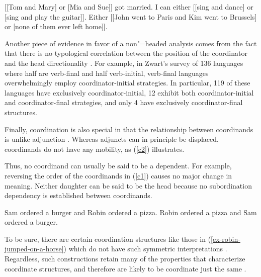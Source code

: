 \eal
\ex {}[[Tom and Mary] or [Mia and Sue]] got married.
\ex I can either [[sing and dance] or [sing and play the guitar]].
\ex Either [[John went to Paris and Kim went to Brussels] or [none of them ever left home]].
\zl

Another piece of evidence in favor of a non"=headed analysis comes from the fact that there is no typological correlation between the position of the coordinator and the head directionality \citep{zwart}.
For example, in Zwart's  survey of 136 languages where half are verb-final and half
verb-initial,  verb-final languages overwhelmingly employ coordinator-initial strategies.
In particular, 119 of these languages have exclusively coordinator-initial, 12 exhibit both coordinator-initial
and coordinator-final strategies, and only 4 have exclusively coordinator-final structures. 


Finally, coordination is also special in that the relationship between coordinands is unlike
adjunction \citep[--160]{levinepostal}.
Whereas adjuncts can in principle be displaced, coordinands do not have any mobility, as (\ref{c2}) illustrates.

\eal
\label{c2}
\zl


\noindent
Thus, no coordinand can usually be said to be a dependent. For example,  reversing the order of the coordinands in (\ref{c1}) causes no major change in meaning. Neither daughter can be said to be the head because no subordination dependency is established between coordinands.

\eal
\label{c1}
\ex Sam ordered a burger and Robin ordered a pizza.
\ex Robin ordered a pizza and Sam ordered a burger.
\zl

\noindent
To be sure, there are certain coordination structures like those in
(\ref{ex-robin-jumped-on-a-horse}) which do not have such symmetric 
interpretations \citep{goldsmith,lakoff86,levinprince86}.
Regardless, such constructions retain many of the properties that characterize coordinate structures, and therefore are likely to be
coordinate just the same \citep[Chapter~5]{kehler}.

